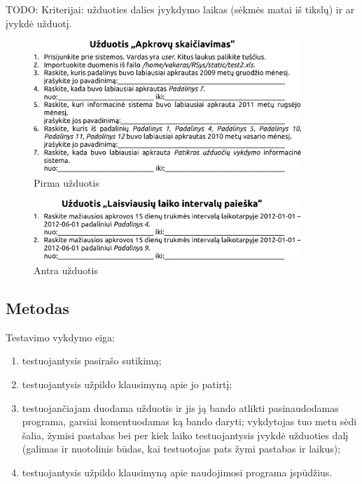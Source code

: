 TODO: Kriterijai: užduoties dalies įvykdymo laikas (sėkmės matai iš
tikslų) ir ar įvykdė užduotį.

\begin{figure}[H]
  \begin{center}
    \includegraphics[width=0.9\textwidth]{./4/pdfs/uzduotis1.pdf}
  \end{center}
  \caption{Pirma užduotis}
  \label{fig:uzduotis_1}
\end{figure}

\begin{figure}[H]
  \begin{center}
    \includegraphics[width=0.9\textwidth]{./4/pdfs/uzduotis2.pdf}
  \end{center}
  \caption{Antra užduotis}
  \label{fig:uzduotis_2}
\end{figure}

\subsection{Metodas}

Testavimo vykdymo eiga:
\begin{enumerate}
  \item testuojantysis pasirašo sutikimą;
  \item testuojantysis užpildo klausimyną apie jo patirtį;
  \item testuojančiajam duodama užduotis ir jis ją bando atlikti
    pasinaudodamas programa, garsiai komentuodamas ką bando daryti;
    vykdytojas tuo metu sėdi šalia, žymisi pastabas bei per kiek
    laiko testuojantysis įvykdė užduoties dalį (galimas ir nuotolinis
    būdas, kai testuotojas pats žymi pastabas ir laikus);
  \item testuojantysis užpildo klausimyną apie naudojimosi programa
    įspūdžius.
\end{enumerate}


